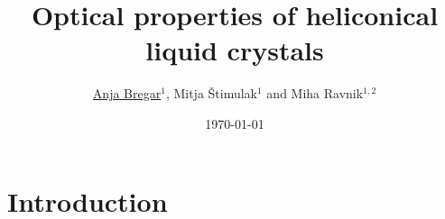\documentclass{beamer}
\newenvironment{slide}[1]{\subsection{#1}\begin{frame}\frametitle{#1}}{\end{frame}}
\begin{document}
\title[ILCC 2018]{Optical properties of heliconical liquid crystals}
\author[Anja Bregar]{\begin{tabular}{rl} \underline{Anja Bregar}$^1$, Mitja Štimulak$^1$ and Miha Ravnik$^{1,2}$ \end{tabular}}

\date{\today}

\section{Introduction}

\begin{slide}{}
 \titlepage
\end{slide}
\end{document}
